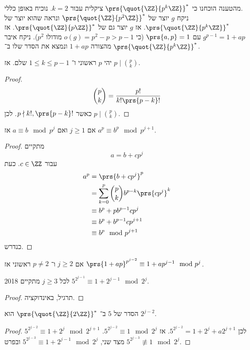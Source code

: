\documentclass[a4paper,10pt,twoside,openany]{book}
\begin{document}
מהטענה הוכחנו כי
$\prs{\quot{\ZZ}{p^k\ZZ}}^*$
ציקלית עבור
$k=2$.
נוכיח באופן כללי.
\\
ניקח
$g$
יוצר של
$\prs{\quot{\ZZ}{p^2 \ZZ}}^*$
ונראה שהוא יוצר של
$\prs{\quot{\ZZ}{p^k\ZZ}}^*$.
אז
$g$
יוצר גם של
$\prs{\quot{\ZZ}{p\ZZ}}^*$.
אז
$g^{p-1} = 1 + ap$
עם
$\prs{a,p} = 1$
(כי
$o(g) = p^2 - p > p-1$
מודולו
$p^2$).
ניקח איבר מהצורה
$1 + ap$
ונמצא את הסדר שלו ב־%
$\prs{\quot{\ZZ}{p^k \ZZ}}^*$.

\begin{lemma}
יהי
$p$
ראשוני ו־%
$1 \leq k \leq p-1$
שלם.
אז
$p \mid \binom{p}{k}$.
\end{lemma}
\begin{proof}
\[\binom{p}{k} = \frac{p!}{k! \prs{p-k}!}\]
כאשר
$p \nmid k!, \prs{p-k}!$.
לכן
$p \mid \binom{p}{k}$.
\end{proof}
\begin{lemma}
אם
$j \geq 1$
ואם
$a \equiv b \mod{p^j}$
אז
$a^p \equiv b^p \mod{p^{j+1}}$.
\end{lemma}
\begin{proof}
מתקיים
\[a = b + cp^j\]
עבור
$c \in \ZZ$.
כעת
\begin{align*}
a^p &= \prs{b+cp^j}^p \\
&= \sum_{k=0}^p \binom{p}{k}b^{p-k} \prs{cp^j}^k \\
&\equiv b^p + pb^{p-1}cp^j \\
&\equiv b^p + b^{p-1}cp^{j+1} \\
&\equiv b^p \mod{p^{j+1}} 
\end{align*}
כנדרש.
\end{proof}
\begin{corollary}
אם
$j \geq 2$
ו־%
$p \neq 2$
ראשוני אז
$\prs{1+ap}^{p^{j-2}} \equiv 1 + ap^{j-1} \mod{p^j}$.
\end{corollary}


\begin{proposition}
לכל
$j \geq 3$
מתקיים%
%
{2018}%
$5^{2^{j-1}} \equiv 1 + 2^{j-1} \mod{2^j}$.
\end{proposition}
\begin{proof}
תרגיל, באינדוקציה.
\end{proof}
\begin{corollary}
הסדר של
$5$
ב־%
$\prs{\quot{\ZZ}{2\ZZ}}^*$
הוא
$2^{j-2}$.
\end{corollary}
\begin{proof}
$5^{2^{j-2}} \equiv 1 + 2^j \mod{2^{j+1}}$
לכן
$5^{2^{j-2}} = 1 + 2^j + a2^{j+1}$.
אז
$5^{2^{j-2}} \equiv 1 \mod{2^j}$.
מצד שני,
$5^{2^{j-3}} \equiv 1 + 2^{j-1} \mod{2^j}$
ובפרט
$5^{2^{j-3}} \not\equiv 1 \mod{2^j}$.
\end{proof}
\end{document}
